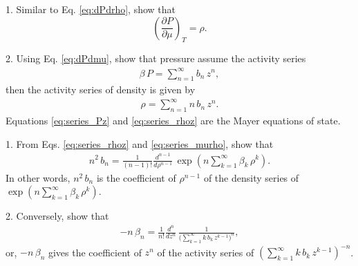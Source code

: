 \documentclass{book}
\begin{document}
1. Similar to Eq. \eqref{eq:dPdrho}, show that
\begin{equation}
  \left(
    \frac{ \partial P } { \partial \mu }
  \right)_T
=
  \rho.
  \label{eq:dPdmu}
\end{equation}


2. Using Eq. \eqref{eq:dPdmu}, show that pressure assume the activity series
\begin{align}
  \beta \, P = \sum_{n = 1}^\infty b_n \, z^n,
  \label{eq:series_Pz}
\end{align}
then the activity series of density is given by
\begin{align}
  \rho = \sum_{n = 1}^\infty n \, b_n \, z^n.
  \label{eq:series_rhoz}
\end{align}
Equations \eqref{eq:series_Pz} and \eqref{eq:series_rhoz}
are the Mayer equations of state.







1. From Eqs. \eqref{eq:series_rhoz} and \eqref{eq:series_murho},
show that
\begin{align}
  n^2 \, b_n
=
  \frac{1} {(n - 1)!}
  \frac{ d^{n-1} } { d \rho^{n-1} }
  \,
  \exp
  \left(
  n \sum_{k = 1}^\infty \beta_k \, \rho^k
  \right).
\end{align}
In other words,
$n^2 \, b_n$
is the coefficient of $\rho^{n-1}$
of the density series of
$\exp \left( n \sum_{k = 1}^\infty \beta_k \, \rho^k \right)$.


2. Conversely, show that
\begin{align}
  -n \, \beta_n
=
  \frac{1} {n!}
  \frac{ d^{n} } { d z^{n} }
  \,
  \frac{1}
  {
  \bigl(
    \sum_{k = 1}^\infty k \, b_k \, z^{k-1}
  \bigr)^n
  },
\end{align}
or,
$-n \, \beta_n$
gives the coefficient of $z^n$
of the activity series of
$\left( \sum_{k = 1}^\infty k \, b_k \, z^{k-1} \right)^{-n}$.
\end{document}
